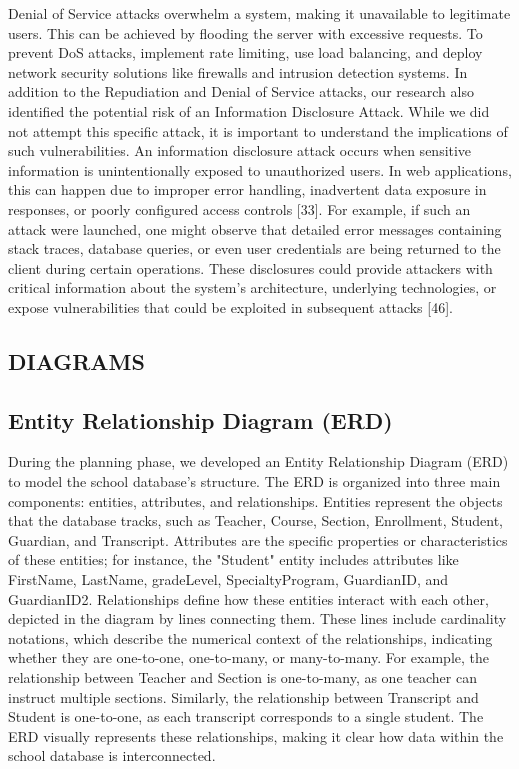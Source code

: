 \documentclass[letterpaper,twocolumn]{article}
\begin{document}
Denial of Service attacks overwhelm a system, making it unavailable to legitimate users. This can be achieved by flooding the server with excessive requests. To prevent DoS attacks, implement rate limiting, use load balancing, and deploy network security solutions like firewalls and intrusion detection systems.
In addition to the Repudiation and Denial of Service attacks, our research also identified the potential risk of an Information Disclosure Attack. While we did not attempt this specific attack, it is important to understand the implications of such vulnerabilities. An information disclosure attack occurs when sensitive information is unintentionally exposed to unauthorized users. In web applications, this can happen due to improper error handling, inadvertent data exposure in responses, or poorly configured access controls [33].
For example, if such an attack were launched, one might observe that detailed error messages containing stack traces, database queries, or even user credentials are being returned to the client during certain operations. These disclosures could provide attackers with critical information about the system's architecture, underlying technologies, or expose vulnerabilities that could be exploited in subsequent attacks [46].
\subsection{DIAGRAMS}
\subsection{Entity Relationship Diagram (ERD)}
During the planning phase, we developed an Entity Relationship Diagram (ERD) to model the school database's structure. The ERD is organized into three main components: entities, attributes, and relationships. Entities represent the objects that the database tracks, such as Teacher, Course, Section, Enrollment, Student, Guardian, and Transcript. Attributes are the specific properties or characteristics of these entities; for instance, the "Student" entity includes attributes like FirstName, LastName, gradeLevel, SpecialtyProgram, GuardianID, and GuardianID2.
Relationships define how these entities interact with each other, depicted in the diagram by lines connecting them. These lines include cardinality notations, which describe the numerical context of the relationships, indicating whether they are one-to-one, one-to-many, or many-to-many. For example, the relationship between Teacher and Section is one-to-many, as one teacher can instruct multiple sections. Similarly, the relationship between Transcript and Student is one-to-one, as each transcript corresponds to a single student. The ERD visually represents these relationships, making it clear how data within the school database is interconnected. 
\end{document}
